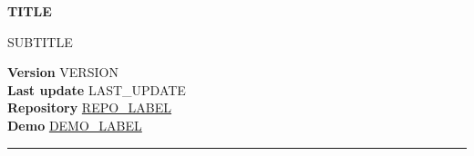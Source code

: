 \documentclass[10pt]{article}
\begin{document}
\sloppy

\noindent
\begin{minipage}{0.7\textwidth}
  \raggedright
  {\color{accent}\fontsize{42}{50}\selectfont\bfseries {{TITLE}}\par}
  \vspace{6pt}
  {\color{mutedtext}\Large {{SUBTITLE}}}
\end{minipage}
\hfill
\begin{minipage}{0.28\textwidth}
  \raggedleft\small\color{mutedtext}
  \textbf{Version} {{VERSION}} \\
  \textbf{Last update} {{LAST_UPDATE}} \\
  \textbf{Repository} \href{{{REPO_URL}}}{{{REPO_LABEL}}} \\
  \textbf{Demo} \href{{{DEMO_URL}}}{{{DEMO_LABEL}}}
\end{minipage}

\vspace{6pt}
\noindent\textcolor{accent}{\rule{\linewidth}{2pt}}
\vspace{14pt}
\end{document}
